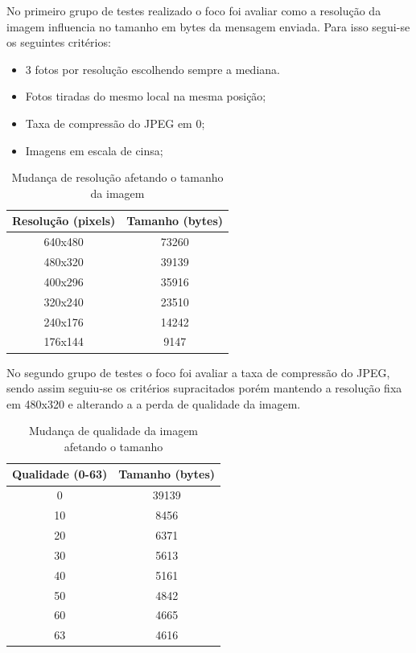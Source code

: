 \documentclass[
article,			%
12pt,				%
oneside,			%
a4paper,			%
english,			%
brazil,				%
sumario=tradicional
]{abntex2}
\begin{document}
No primeiro grupo de testes realizado o foco foi avaliar como a resolução da imagem influencia no tamanho em bytes da mensagem enviada. Para isso segui-se os seguintes critérios:
\begin{itemize}
    \setlength\itemsep{0.01cm}
    \item 3 fotos por resolução escolhendo sempre a mediana.
    \item Fotos tiradas do mesmo local na mesma posição;
    \item Taxa de compressão do JPEG em 0;
    \item Imagens em escala de cinsa;
\end{itemize}

\begin{table}[!h]
\centering
\begin{tabular}{@{}c|c@{}}
\toprule
Resolução (pixels) & Tamanho (bytes) \\ \midrule
640x480            & 73260           \\
480x320            & 39139           \\
400x296            & 35916           \\
320x240            & 23510           \\
240x176            & 14242           \\
176x144            & 9147            \\ \bottomrule
\end{tabular}
\caption{Mudança de resolução afetando o tamanho da imagem}
\label{tab:resolution}
\end{table}

No segundo grupo de testes o foco foi avaliar a taxa de compressão do JPEG, sendo assim seguiu-se os critérios supracitados porém mantendo a resolução fixa em 480x320 e alterando a a perda de qualidade da imagem.

\begin{table}[!h]
\centering
\begin{tabular}{@{}c|c@{}}
\toprule
Qualidade (0-63) & Tamanho (bytes) \\ \midrule
0                & 39139           \\
10               & 8456            \\
20               & 6371            \\
30               & 5613            \\
40               & 5161            \\
50               & 4842            \\
60               & 4665            \\
63               & 4616            \\ \bottomrule
\end{tabular}
\caption{Mudança de qualidade da imagem afetando o tamanho}
\label{tab:quality}
\end{table}
\end{document}
